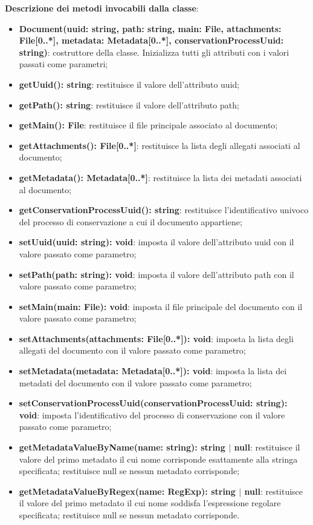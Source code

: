 \documentclass[a4paper,12pt]{article}
\begin{document}
{{{              \noindent \textbf{Descrizione dei metodi invocabili dalla classe}:
                \begin{itemize}
                    \item \textbf{Document(uuid: string, path: string, main: File, attachments: File[0..*], metadata: Metadata[0..*], conservationProcessUuid: string)}: costruttore della classe. Inizializza tutti gli attributi con i valori passati come parametri;
                    \item \textbf{getUuid(): string}: restituisce il valore dell'attributo uuid;
                    \item \textbf{getPath(): string}: restituisce il valore dell'attributo path;
                    \item \textbf{getMain(): File}: restituisce il file principale associato al documento;
                    \item \textbf{getAttachments(): File[0..*]}: restituisce la lista degli allegati associati al documento;
                    \item \textbf{getMetadata(): Metadata[0..*]}: restituisce la lista dei metadati associati al documento;
                    \item \textbf{getConservationProcessUuid(): string}: restituisce l'identificativo univoco del processo di conservazione a cui il documento appartiene;
                    \item \textbf{setUuid(uuid: string): void}: imposta il valore dell'attributo uuid con il valore passato come parametro;
                    \item \textbf{setPath(path: string): void}: imposta il valore dell'attributo path con il valore passato come parametro;
                    \item \textbf{setMain(main: File): void}: imposta il file principale del documento con il valore passato come parametro;
                    \item \textbf{setAttachments(attachments: File[0..*]): void}: imposta la lista degli allegati del documento con il valore passato come parametro;
                    \item \textbf{setMetadata(metadata: Metadata[0..*]): void}: imposta la lista dei metadati del documento con il valore passato come parametro;
                    \item \textbf{setConservationProcessUuid(conservationProcessUuid: string): void}: imposta l'identificativo del processo di conservazione con il valore passato come parametro;
                    \item \textbf{getMetadataValueByName(name: string): string $|$ null}: restituisce il valore del primo metadato il cui nome corrisponde esattamente alla stringa specificata; restituisce null se nessun metadato corrisponde;
                    \item \textbf{getMetadataValueByRegex(name: RegExp): string $|$ null}: restituisce il valore del primo metadato il cui nome soddisfa l'espressione regolare specificata; restituisce null se nessun metadato corrisponde.
                \end{itemize}
}}}
\end{document}
